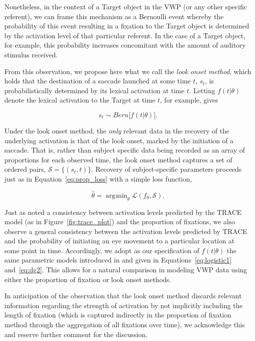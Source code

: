 \documentclass{article}
\DeclareMathOperator*{\argmin}{arg\!\min}
\begin{document}
Nonetheless, in the context of a Target object in the VWP (or any other specific referent), we can frame this mechanism as a Bernoulli event whereby the probability of this event resulting in a fixation to the Target object is determined by the activation level of that particular referent. In the case of a Target object, for example, this probability increases concomitant with the amount of auditory stimulus received.

From this observation, we propose here what we call the \textit{look onset method}, which holds that the destination of a saccade launched at some time $t$, $s_t$, is probabilistically determined by its lexical activation at time $t$. Letting $f(t|\theta)$ denote the lexical activation to the Target at time $t$, for example, gives

\begin{equation}\label{eq:onset_distribution}
s_t \sim Bern \big[ f( t  |  \theta) \big].
\end{equation}

Under the look onset method, the \textit{only} relevant data in the recovery of the underlying activation is that of the look onset, marked by the initiation of a saccade. That is, rather than subject specific data being recorded as an array of proportions for each observed time, the look onset method captures a set of ordered pairs, $\mathcal{S} = \{(s_t, t)\}$. Recovery of subject-specific parameters proceeds just as in Equation~\ref{eq:prop_loss} with  a simple loss function,

\begin{equation}
\hat{\theta} = \argmin_{\theta} \mathcal{L}(f_{\theta}, \mathcal{S}).
\end{equation}


Just as \citet{allopenna1998tracking} noted a consistency between activation levels predicted by the TRACE model (as in Figure~\ref{fig:trace_plot}) and the proportion of fixations, we also observe a general consistency between the activation levels predicted by TRACE and the probability of initiating an eye movement to a particular location at some point in time. Accordingly, we adopt as our specification of $f(t|\theta)$ the same parametric models introduced in \citet{mcmurray2010individual} and given in Equations~\ref{eq:logistic1} and~\ref{eq:dg2}. This allows for a natural comparison in modeling VWP data using either the proportion of fixation or look onset methods.

In anticipation of the observation that the look onset method discards relevant information regarding the strength of activation by not implicitly including the length of fixation (which is captured indirectly in the proportion of fixation method through the aggregation of all fixations over time), we acknowledge this and reserve further comment for the discussion.
\end{document}
